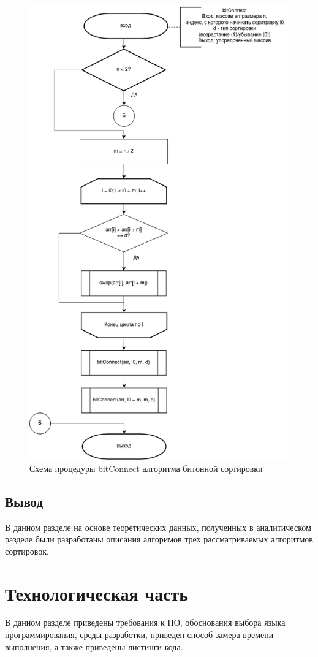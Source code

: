 \documentclass[12pt]{report}
\begin{document}
	\begin{figure}[H]
		\centering
		\includegraphics[width=0.7\linewidth]{bitonic_3}
		\caption{Схема процедуры bitConnect алгоритма битонной сортировки}
		\label{fig:schema_insertion}
	\end{figure}
	
	\section*{Вывод}
	
	В данном разделе на основе теоретических данных, полученных в аналитическом разделе были разработаны описания алгоримов трех рассматриваемых алгоритмов сортировок.
	
	\chapter{Технологическая часть}
	
	В данном разделе приведены требования к ПО, обоснования выбора языка программирования, среды разработки, приведен способ замера времени выполнения, а также приведены листинги кода.
	
\end{document}
